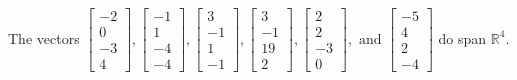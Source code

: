 \begin{exercise}
\begin{exerciseStatement}
  \end{exerciseStatement}
  \begin{exerciseAnswer}
   The vectors \(\left[\begin{array}{r}
-2 \\
0 \\
-3 \\
4
\end{array}\right] , \left[\begin{array}{r}
-1 \\
1 \\
-4 \\
-4
\end{array}\right] , \left[\begin{array}{r}
3 \\
-1 \\
1 \\
-1
\end{array}\right] , \left[\begin{array}{r}
3 \\
-1 \\
19 \\
2
\end{array}\right] , \left[\begin{array}{r}
2 \\
2 \\
-3 \\
0
\end{array}\right] , \text{ and } \left[\begin{array}{r}
-5 \\
4 \\
2 \\
-4
\end{array}\right]\) 
  	 do  
	span \(\mathbb{R}^4\).
  


  \end{exerciseAnswer}
\end{exercise}